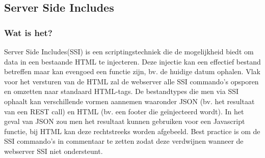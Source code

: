
	\subsection{Server Side Includes} 
	\subsubsection{Wat is het?}
	Server Side Includes(SSI) is een scriptingstechniek die de mogelijkheid biedt om data in een bestaande HTML te injecteren. Deze injectie kan een effectief bestand betreffen maar kan evengoed een functie zijn, bv. de huidige datum ophalen. Vlak voor het versturen van de HTML zal de webserver alle SSI commando's opsporen en omzetten naar standaard HTML-tags. De bestandtypes die men via SSI ophaalt kan verschillende vormen aannemen waaronder JSON (bv. het resultaat van een REST call) en HTML (bv. een footer die ge\"injecteerd wordt). In het geval van JSON zou men het resultaat kunnen gebruiken voor een Javascript functie, bij HTML kan deze rechtstreeks worden afgebeeld. Best practice is om de SSI commando's in commentaar te zetten zodat deze verdwijnen wanneer de webserver SSI niet ondersteunt.
